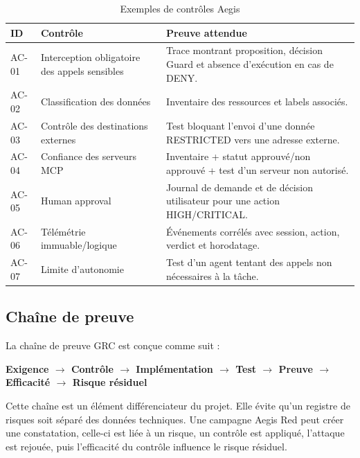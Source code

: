 \begin{table}[H]
\centering
\caption{Exemples de contrôles Aegis}
\label{tab:aegis-controls}
\begin{tabularx}{\textwidth}{p{1.5cm} p{4cm} X}
\toprule
\textbf{ID} & \textbf{Contrôle} & \textbf{Preuve attendue} \\
\midrule
AC-01 & Interception obligatoire des appels sensibles & Trace montrant proposition, décision Guard et absence d'exécution en cas de DENY. \\
AC-02 & Classification des données & Inventaire des ressources et labels associés. \\
AC-03 & Contrôle des destinations externes & Test bloquant l'envoi d'une donnée RESTRICTED vers une adresse externe. \\
AC-04 & Confiance des serveurs MCP & Inventaire + statut approuvé/non approuvé + test d'un serveur non autorisé. \\
AC-05 & Human approval & Journal de demande et de décision utilisateur pour une action HIGH/CRITICAL. \\
AC-06 & Télémétrie immuable/logique & Événements corrélés avec session, action, verdict et horodatage. \\
AC-07 & Limite d'autonomie & Test d'un agent tentant des appels non nécessaires à la tâche. \\
\bottomrule
\end{tabularx}
\end{table}

\subsection{Chaîne de preuve}

La chaîne de preuve GRC est conçue comme suit :

\begin{center}
\textbf{Exigence $\rightarrow$ Contrôle $\rightarrow$ Implémentation $\rightarrow$ Test $\rightarrow$ Preuve $\rightarrow$ Efficacité $\rightarrow$ Risque résiduel}
\end{center}

Cette chaîne est un élément différenciateur du projet. Elle évite qu'un registre de risques soit séparé des données techniques. Une campagne Aegis Red peut créer une constatation, celle-ci est liée à un risque, un contrôle est appliqué, l'attaque est rejouée, puis l'efficacité du contrôle influence le risque résiduel.

